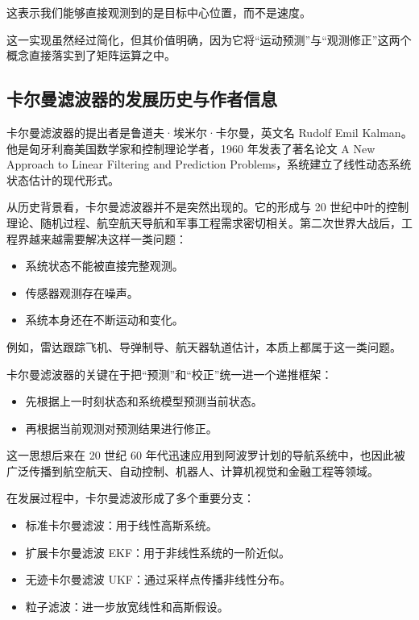 这表示我们能够直接观测到的是目标中心位置，而不是速度。

这一实现虽然经过简化，但其价值明确，因为它将``运动预测''与``观测修正''这两个概念直接落实到了矩阵运算之中。

\subsection{卡尔曼滤波器的发展历史与作者信息}\label{src-experiment-case2-h44}

卡尔曼滤波器的提出者是鲁道夫·埃米尔·卡尔曼，英文名 Rudolf Emil
Kalman。他是匈牙利裔美国数学家和控制理论学者，1960 年发表了著名论文 A
New Approach to Linear Filtering and Prediction
Problems，系统建立了线性动态系统状态估计的现代形式。

从历史背景看，卡尔曼滤波器并不是突然出现的。它的形成与 20
世纪中叶的控制理论、随机过程、航空航天导航和军事工程需求密切相关。第二次世界大战后，工程界越来越需要解决这样一类问题：

\begin{itemize}
\tightlist
\item
  系统状态不能被直接完整观测。
\item
  传感器观测存在噪声。
\item
  系统本身还在不断运动和变化。
\end{itemize}

例如，雷达跟踪飞机、导弹制导、航天器轨道估计，本质上都属于这一类问题。

卡尔曼滤波器的关键在于把``预测''和``校正''统一进一个递推框架：

\begin{itemize}
\tightlist
\item
  先根据上一时刻状态和系统模型预测当前状态。
\item
  再根据当前观测对预测结果进行修正。
\end{itemize}

这一思想后来在 20 世纪 60
年代迅速应用到阿波罗计划的导航系统中，也因此被广泛传播到航空航天、自动控制、机器人、计算机视觉和金融工程等领域。

在发展过程中，卡尔曼滤波形成了多个重要分支：

\begin{itemize}
\tightlist
\item
  标准卡尔曼滤波：用于线性高斯系统。
\item
  扩展卡尔曼滤波 EKF：用于非线性系统的一阶近似。
\item
  无迹卡尔曼滤波 UKF：通过采样点传播非线性分布。
\item
  粒子滤波：进一步放宽线性和高斯假设。
\end{itemize}

